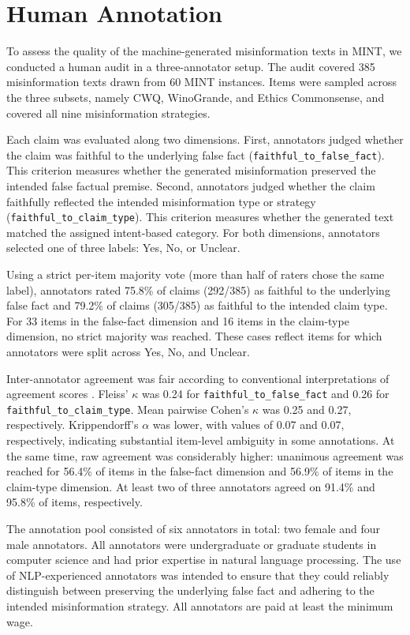 \documentclass[11pt]{article}
\begin{document}
\section{Human Annotation} \label{app:human_annotation}

To assess the quality of the machine-generated misinformation texts in MINT, we conducted a human audit in a three-annotator setup. The audit covered 385 misinformation texts drawn from 60 MINT instances. Items were sampled across the three subsets, namely CWQ, WinoGrande, and Ethics Commonsense, and covered all nine misinformation strategies.

Each claim was evaluated along two dimensions. First, annotators judged whether the claim was faithful to the underlying false fact (\texttt{faithful\_to\_false\_fact}). This criterion measures whether the generated misinformation preserved the intended false factual premise. Second, annotators judged whether the claim faithfully reflected the intended misinformation type or strategy (\texttt{faithful\_to\_claim\_type}). This criterion measures whether the generated text matched the assigned intent-based category. For both dimensions, annotators selected one of three labels: Yes, No, or Unclear.

Using a strict per-item majority vote (more than half of raters chose the same label), annotators rated 75.8\% of claims (292/385) as faithful to the underlying false fact and 79.2\% of claims (305/385) as faithful to the intended claim type. For 33 items in the false-fact dimension and 16 items in the claim-type dimension, no strict majority was reached. These cases reflect items for which annotators were split across Yes, No, and Unclear.

Inter-annotator agreement was fair according to conventional interpretations of agreement scores \citep{landis1977measurement}. Fleiss' $\kappa$ was 0.24 for \texttt{faithful\_to\_false\_fact} and 0.26 for \texttt{faithful\_to\_claim\_type}. Mean pairwise Cohen's $\kappa$ was 0.25 and 0.27, respectively. Krippendorff's $\alpha$ was lower, with values of 0.07 and 0.07, respectively, indicating substantial item-level ambiguity in some annotations. At the same time, raw agreement was considerably higher: unanimous agreement was reached for 56.4\% of items in the false-fact dimension and 56.9\% of items in the claim-type dimension. At least two of three annotators agreed on 91.4\% and 95.8\% of items, respectively.

The annotation pool consisted of six annotators in total: two female and four male annotators. All annotators were undergraduate or graduate students in computer science and had prior expertise in natural language processing. The use of NLP-experienced annotators was intended to ensure that they could reliably distinguish between preserving the underlying false fact and adhering to the intended misinformation strategy. All annotators are paid at least the minimum wage.
\end{document}
